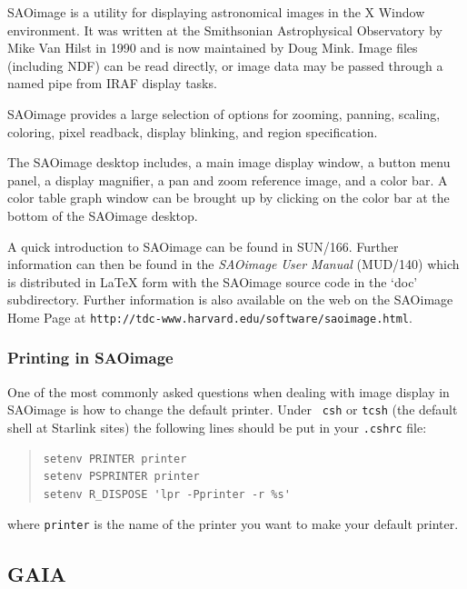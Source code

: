 \documentclass[twoside,11pt]{article}
\newcommand{\htmladdnormallink}[2]{#1}
\newcommand{\latex}[1]{#1}
\newcommand{\xref}[3]{#1}
\newcommand{\xlabel}[1]{}
\begin{document}
\htmladdnormallink{SAOimage}{http://tdc-www.harvard.edu/software/saoimage.html}
is a utility for displaying astronomical images in the X Window
environment. It was written at the Smithsonian Astrophysical
Observatory by Mike Van Hilst in 1990 and is now maintained by Doug
Mink. Image files (including \xref{NDF}{sun33}{}) can be read
directly, or image data may be passed through a named pipe from IRAF
display tasks.

SAOimage provides a large selection of options for zooming, panning,
scaling, coloring, pixel readback, display blinking, and region
specification.

The SAOimage desktop includes, a main image display window, a button
menu panel, a display magnifier, a pan and zoom reference image, and a
color bar. A color table graph window can be brought up by clicking on
the color bar at the bottom of the SAOimage desktop.

A quick introduction to SAOimage can be found in
\xref{SUN/166}{sun166}{}. Further information can then be found in the
{\em SAOimage User Manual} (MUD/140) which is distributed in LaTeX
form with the SAOimage source code in the `doc' subdirectory. Further
information is also available on the web on the
\htmladdnormallink{SAOimage Home
Page}{http://tdc-www.harvard.edu/software/saoimage.html}\latex{ at
{\tt http://tdc-www.harvard.edu/software/saoimage.html}}.

\subsubsection{Printing in SAOimage}

One of the most commonly asked questions when dealing with image
display in SAOimage is how to change the default printer. Under {\tt
csh} or {\tt tcsh} (the default shell at Starlink sites) the following
lines should be put in your {\tt .cshrc} file:

\small
\begin{quote}
\begin{verbatim}
setenv PRINTER printer
setenv PSPRINTER printer
setenv R_DISPOSE 'lpr -Pprinter -r %s'
\end{verbatim}
\end{quote}
\normalsize

where \verb+printer+ is the name of the printer you want to make your default printer.

\subsection{\xlabel{sc15_gaia}GAIA\label{sc15_gaia}}
\end{document}
